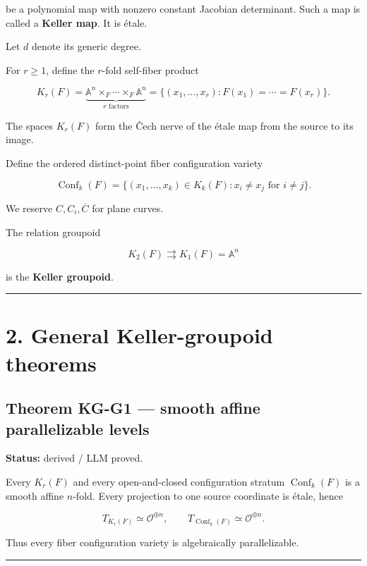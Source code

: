 be a polynomial map with nonzero constant Jacobian determinant. Such a
map is called a \textbf{Keller map}. It is étale.

Let \(d\) denote its generic degree.

For \(r\ge1\), define the \(r\)-fold self-fiber product

\[
K_r(F)
=
\underbrace{\mathbb A^n\times_F\cdots\times_F\mathbb A^n}_{r\text{ factors}}
=
\{(x_1,\ldots,x_r):F(x_1)=\cdots=F(x_r)\}.
\]

The spaces \(K_r(F)\) form the Čech nerve of the étale map from the
source to its image.

Define the ordered distinct-point fiber configuration variety

\[
\operatorname{Conf}_k(F)
=
\{(x_1,\ldots,x_k)\in K_k(F):x_i\ne x_j\text{ for }i\ne j\}.
\]

We reserve \(C,C_i,\overline C\) for plane curves.

The relation groupoid

\[
K_2(F)\rightrightarrows K_1(F)=\mathbb A^n
\]

is the \textbf{Keller groupoid}.

\begin{center}\rule{0.5\linewidth}{0.5pt}\end{center}

\section{2. General Keller-groupoid
theorems}\label{general-keller-groupoid-theorems}

\subsection{Theorem KG-G1 --- smooth affine parallelizable
levels}\label{theorem-kg-g1-smooth-affine-parallelizable-levels}

\textbf{Status:} derived / LLM proved.

Every \(K_r(F)\) and every open-and-closed configuration stratum
\(\operatorname{Conf}_k(F)\) is a smooth affine \(n\)-fold. Every
projection to one source coordinate is étale, hence

\[
T_{K_r(F)}\simeq\mathcal O^{\oplus n},
\qquad
T_{\operatorname{Conf}_k(F)}\simeq\mathcal O^{\oplus n}.
\]

Thus every fiber configuration variety is algebraically parallelizable.

\begin{center}\rule{0.5\linewidth}{0.5pt}\end{center}

